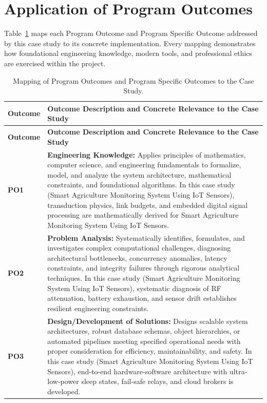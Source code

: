 \section{Application of Program Outcomes}
Table~\ref{tab:po} maps each Program Outcome and Program Specific Outcome addressed by this case study to its concrete implementation. Every mapping demonstrates how foundational engineering knowledge, modern tools, and professional ethics are exercised within the project.

{\small
\begin{longtable}{@{}>{\centering\arraybackslash}p{1.8cm} p{13.2cm}@{}}
    \caption{Mapping of Program Outcomes and Program Specific Outcomes to the Case Study.}\label{tab:po}\\
    \toprule
    \textbf{Outcome} & \textbf{Outcome Description and Concrete Relevance to the Case Study} \\
    \midrule
    \endfirsthead
    \toprule
    \textbf{Outcome} & \textbf{Outcome Description and Concrete Relevance to the Case Study} \\
    \midrule
    \endhead
\textbf{PO1} & \textbf{Engineering Knowledge:} Applies principles of mathematics, computer science, and engineering fundamentals to formalize, model, and analyze the system architecture, mathematical constraints, and foundational algorithms. In this case study (Smart Agriculture Monitoring System Using IoT Sensors), transduction physics, link budgets, and embedded digital signal processing are mathematically derived for Smart Agriculture Monitoring System Using IoT Sensors. \\
    \addlinespace
\textbf{PO2} & \textbf{Problem Analysis:} Systematically identifies, formulates, and investigates complex computational challenges, diagnosing architectural bottlenecks, concurrency anomalies, latency constraints, and integrity failures through rigorous analytical techniques. In this case study (Smart Agriculture Monitoring System Using IoT Sensors), systematic diagnosis of RF attenuation, battery exhaustion, and sensor drift establishes resilient engineering constraints. \\
    \addlinespace
\textbf{PO3} & \textbf{Design/Development of Solutions:} Designs scalable system architectures, robust database schemas, object hierarchies, or automated pipelines meeting specified operational needs with proper consideration for efficiency, maintainability, and safety. In this case study (Smart Agriculture Monitoring System Using IoT Sensors), end-to-end hardware-software architecture with ultra-low-power sleep states, fail-safe relays, and cloud brokers is developed. \\

\end{longtable}}
